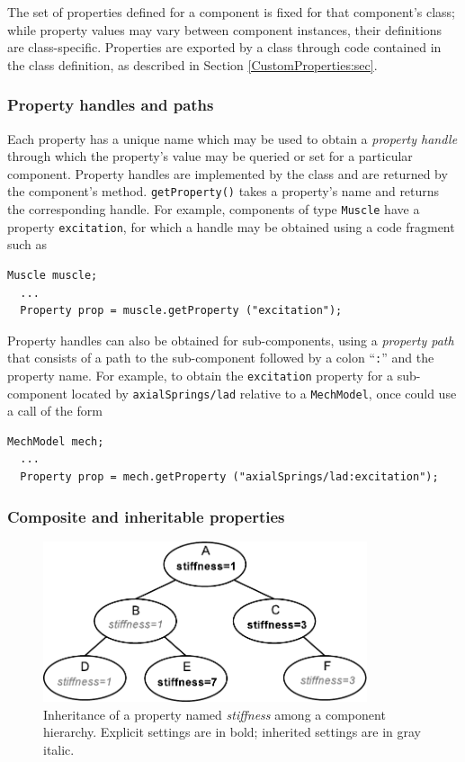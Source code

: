 The set of properties defined for a component is fixed for that
component's class; while property values may vary between component
instances, their definitions are class-specific.  
Properties are exported by a class through code contained in the class
definition, as described in Section \ref{CustomProperties:sec}.

\subsubsection{Property handles and paths}
\label{PropertyHandlesAndPaths:sec}

Each property has a unique name which may be used to obtain a {\it
property handle} through which the property's value may be queried or
set for a particular component. Property handles are implemented by
the class  and are returned by
the component's
 method.
{\tt getProperty()} takes a property's name and returns the
corresponding handle. For example, components of type {\tt Muscle}
have a property {\tt excitation}, for which a handle
may be obtained using a code fragment such as
\begin{lstlisting}[]
  Muscle muscle; 
  ...
  Property prop = muscle.getProperty ("excitation");
\end{lstlisting}
Property handles can also be obtained for
sub-components, using a {\it property path} that consists
of a path to the sub-component followed by a colon
``{\tt :}'' and the property name. For example,
to obtain the {\tt excitation} property for a sub-component
located by {\tt axialSprings/lad} relative to a {\tt MechModel},
once could use a call of the form
\begin{lstlisting}[]
  MechModel mech;
  ...
  Property prop = mech.getProperty ("axialSprings/lad:excitation");
\end{lstlisting}

\subsubsection{Composite and inheritable properties}
\label{CompositeInheritableProperties:sec}

\begin{figure}[t]
\begin{center}
 \includegraphics[width=3.75in]{images/inheritedProperties}
\end{center}
\caption{Inheritance of a property named {\it stiffness} among
a component hierarchy. Explicit settings are in bold; inherited settings
are in gray italic.}
\label{inheritedProperties:fig}
\end{figure}


